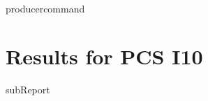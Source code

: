 {{ producercommand }}
\renewcommand{\DTRPcs}{I10} %
\renewcommand{\DTRPcsLong}{I10}


    \section{Results for PCS \DTRPcsLong}

    {{subReport}}
    \newpage

